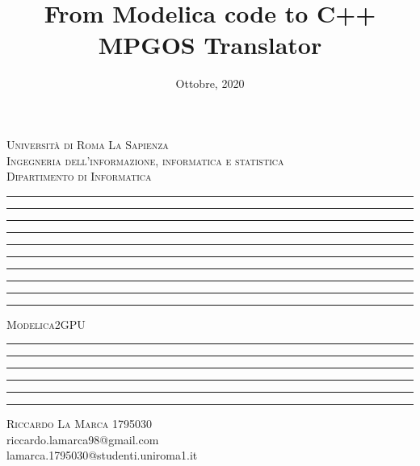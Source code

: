 \documentclass[11pt]{report}
\title{From Modelica code to C++ MPGOS Translator}
\date{Ottobre, 2020}
\makeatletter
\let\documentTitle\@title
\let\academicYear\@date
\makeatother
\begin{document}
\begin{titlepage}
    \centering
    \textsc{\Large Università di Roma La Sapienza\\[.3cm]Ingegneria dell'informazione, informatica e statistica\\[.3cm]Dipartimento di Informatica}
    \vspace*{1cm}
    \hrule\hrule\hrule\hrule\hrule
    \vspace*{0.1cm}
    \hrule\hrule\hrule\hrule\hrule
    \vspace*{1cm}
    \textsc{\Huge Modelica2GPU}
    \vspace*{1cm}
    \hrule\hrule
    \vspace*{1cm}
    \textbf{\Large \documentTitle}
    \vspace*{1cm}
    \hrule\hrule\hrule\hrule
    \vspace*{3cm}
    \textsc{\large Riccardo La Marca 1795030}\\
    \vspace*{.2cm}
    {\large riccardo.lamarca98@gmail.com}\\
    \vspace*{.2cm}
    {\large lamarca.1795030@studenti.uniroma1.it}\\
    \vspace*{8cm}
    {\normalsize \academicYear}
\end{titlepage}
\tableofcontents

\end{document}
